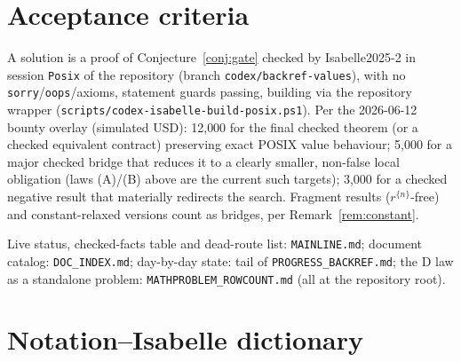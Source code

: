 \documentclass[11pt]{article}
\theoremstyle{remark}
\begin{document}
\section{Acceptance criteria}\label{sec:accept}

A solution is a proof of Conjecture~\ref{conj:gate} checked by Isabelle2025-2
in session \texttt{Posix} of the repository (branch
\texttt{codex/backref-values}), with no \texttt{sorry}/\texttt{oops}/axioms,
statement guards passing, building via the repository wrapper
(\texttt{scripts/codex-isabelle-build-posix.ps1}).  Per the 2026-06-12 bounty
overlay (simulated USD): 12{,}000 for the final checked theorem (or a checked
equivalent contract) preserving exact POSIX value behaviour; 5{,}000 for a
major checked bridge that reduces it to a clearly smaller, non-false local
obligation (laws (A)/(B) above are the current such targets); 3{,}000
for a checked negative result that materially redirects the search.
Fragment results ($r^{\{n\}}$-free) and constant-relaxed versions count as
bridges, per Remark~\ref{rem:constant}.

{\sloppy
Live status, checked-facts table and dead-route list: \texttt{MAINLINE.md};
document catalog: \texttt{DOC\_INDEX.md}; day-by-day state: tail of
\texttt{PROGRESS\_BACKREF.md}; the D law as a standalone problem:
\texttt{MATHPROBLEM\_ROWCOUNT.md} (all at the repository root).\par}

\section{Notation--Isabelle dictionary}\label{sec:names}
\end{document}
